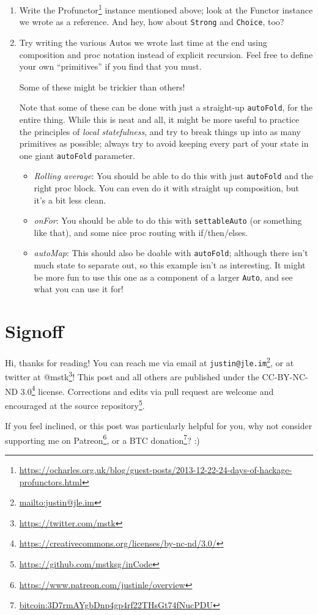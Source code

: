 \documentclass[]{article}
\renewcommand{\href}[2]{#2\footnote{\url{#1}}}
\begin{document}
\begin{enumerate}
\def\labelenumi{\arabic{enumi}.}
\item
  Write the
  \href{https://ocharles.org.uk/blog/guest-posts/2013-12-22-24-days-of-hackage-profunctors.html}{Profunctor}
  instance mentioned above; look at the Functor instance we wrote as a
  reference. And hey, how about \texttt{Strong} and \texttt{Choice}, too?
\item
  Try writing the various Autos we wrote last time at the end using composition
  and proc notation instead of explicit recursion. Feel free to define your own
  ``primitives'' if you find that you must.

  Some of these might be trickier than others!

  Note that some of these can be done with just a straight-up \texttt{autoFold},
  for the entire thing. While this is neat and all, it might be more useful to
  practice the principles of \emph{local statefulness}, and try to break things
  up into as many primitives as possible; always try to avoid keeping every part
  of your state in one giant \texttt{autoFold} parameter.

  \begin{itemize}
  \item
    \emph{Rolling average}: You should be able to do this with just
    \texttt{autoFold} and the right proc block. You can even do it with straight
    up composition, but it's a bit less clean.
  \item
    \emph{onFor}: You should be able to do this with \texttt{settableAuto} (or
    something like that), and some nice proc routing with if/then/elses.
  \item
    \emph{autoMap}: This should also be doable with \texttt{autoFold}; although
    there isn't much state to separate out, so this example isn't as
    interesting. It might be more fun to use this one as a component of a larger
    \texttt{Auto}, and see what you can use it for!
  \end{itemize}
\end{enumerate}

\hypertarget{signoff}{%
\section{Signoff}\label{signoff}}

Hi, thanks for reading! You can reach me via email at
\href{mailto:justin@jle.im}{\nolinkurl{justin@jle.im}}, or at twitter at
\href{https://twitter.com/mstk}{@mstk}! This post and all others are published
under the \href{https://creativecommons.org/licenses/by-nc-nd/3.0/}{CC-BY-NC-ND
3.0} license. Corrections and edits via pull request are welcome and encouraged
at \href{https://github.com/mstksg/inCode}{the source repository}.

If you feel inclined, or this post was particularly helpful for you, why not
consider \href{https://www.patreon.com/justinle/overview}{supporting me on
Patreon}, or a \href{bitcoin:3D7rmAYgbDnp4gp4rf22THsGt74fNucPDU}{BTC donation}?
:)
\end{document}
